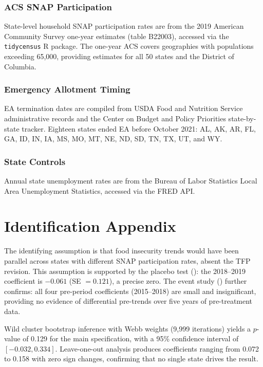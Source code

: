 \documentclass[12pt]{article}
\begin{document}
\subsubsection*{ACS SNAP Participation} State-level household SNAP participation rates are from the 2019 American Community Survey one-year estimates (table B22003), accessed via the \texttt{tidycensus} R package. The one-year ACS covers geographies with populations exceeding 65,000, providing estimates for all 50 states and the District of Columbia.

\subsubsection*{Emergency Allotment Timing} EA termination dates are compiled from USDA Food and Nutrition Service administrative records and the Center on Budget and Policy Priorities state-by-state tracker. Eighteen states ended EA before October 2021: AL, AK, AR, FL, GA, ID, IN, IA, MS, MO, MT, NE, ND, SD, TN, TX, UT, and WY.

\subsubsection*{State Controls} Annual state unemployment rates are from the Bureau of Labor Statistics Local Area Unemployment Statistics, accessed via the FRED API.

\section{Identification Appendix}
\label{app:id}

The identifying assumption is that food insecurity trends would have been parallel across states with different SNAP participation rates, absent the TFP revision. This assumption is supported by the placebo test (): the 2018--2019 coefficient is $-0.061$ (SE $= 0.121$), a precise zero. The event study () further confirms: all four pre-period coefficients (2015--2018) are small and insignificant, providing no evidence of differential pre-trends over five years of pre-treatment data.

Wild cluster bootstrap inference with Webb weights (9,999 iterations) yields a $p$-value of 0.129 for the main specification, with a 95\% confidence interval of $[-0.032, 0.334]$. Leave-one-out analysis produces coefficients ranging from 0.072 to 0.158 with zero sign changes, confirming that no single state drives the result.
\end{document}
